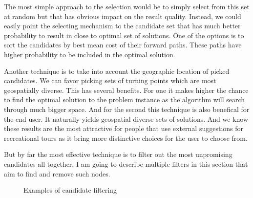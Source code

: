 \documentclass{ctuthesis}
\begin{document}
The most simple approach to the selection would be to simply select from this set at random but that has obvious impact on the result quality. Instead, we could easily point the selecting mechanism to the candidate set that has much better probability to result in close to optimal set of solutions. One of the options is to sort the candidates by best mean cost of their forward paths. These paths have higher probability to be included in the optimal solution.\par

Another technique is to take into account the geographic location of picked candidates. We can favor picking sets of turning points which are most geospatially diverse. This has several benefits. For one it makes higher the chance to find the optimal solution to the problem instance as the algorithm will search through much bigger space. And for the second this technique is also benefical for the end user. It naturally yields geospatial diverse sets of solutions. And we know these results are the most attractive for people that use external suggestions for recreational tours as it bring more distinctive choices for the user to choose from.\par

But by far the most effective technique is to filter out the most unpromising candidates all together. I am going to describe multiple filters in this section that aim to find and remove such nodes.


\begin{figure}[!tbp]
  \centering
  \hfill
  \caption{Examples of candidate filtering}
\end{figure}
\end{document}
